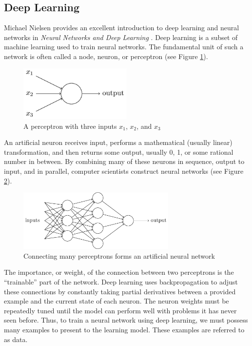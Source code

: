\subsection{Deep Learning}
Michael Nielsen provides an excellent introduction to deep learning and neural networks in \textit{Neural Networks and Deep Learning} \cite{nielsen2015}. Deep learning is a subset of machine learning used to train neural networks. The fundamental unit of such a network is often called a node, neuron, or perceptron (see Figure \ref{fig:perceptron}).
\begin{figure}[ht]
  \centering
  \includegraphics[width=0.5\textwidth]{figures/perceptron.png}
  \caption{A perceptron with three inputs $x_1$, $x_2$, and $x_3$ \cite{nielsen2015}}
  \label{fig:perceptron}
\end{figure}

An artificial neuron receives input, performs a mathematical (usually linear) transformation, and then returns some output, usually 0, 1, or some rational number in between. By combining many of these neurons in sequence, output to input, and in parallel, computer scientists construct neural networks (see Figure \ref{fig:perceptrons}).
\begin{figure}[ht]
  \centering
  \includegraphics[width=0.7\textwidth]{figures/perceptrons.png}
  \caption{Connecting many perceptrons forms an artificial neural network \cite{nielsen2015}}
  \label{fig:perceptrons}
\end{figure}

The importance, or weight, of the connection between two perceptrons is the ``trainable'' part of the network. Deep learning uses backpropagation to adjust these connections by constantly taking partial derivatives between a provided example and the current state of each neuron. The neuron weights must be repeatedly tuned until the model can perform well with problems it has never seen before. Thus, to train a neural network using deep learning, we must possess many examples to present to the learning model. These examples are referred to as data.


